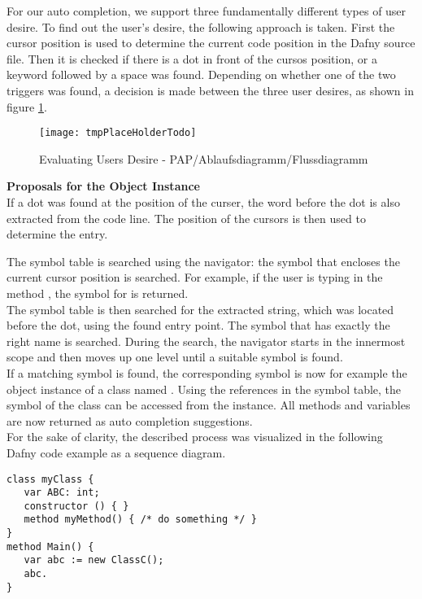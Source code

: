 For our auto completion, we support three fundamentally different types of user desire.
To find out the user's desire, the following approach is taken.
First the cursor position is used to determine the current code position in the Dafny source file.
Then it is checked if there is a dot in front of the cursos position,
or a  keyword followed by a space was found.
Depending on whether one of the two triggers was found,
a decision is made between the three user desires, as shown in figure \ref{fig:get_users_desire}.

\begin{figure}[H]
    \centering
    \texttt{[image: tmpPlaceHolderTodo]}
    \caption{Evaluating Users Desire - PAP/Ablaufsdiagramm/Flussdiagramm}
    \label{fig:get_users_desire}
\end{figure}

\textbf{Proposals for the Object Instance}\\
If a dot was found at the position of the curser, the word before the dot is also extracted from the code line.
The position of the cursors is then used to determine the entry.

The symbol table is searched using the navigator:
the symbol that encloses the current cursor position is searched.
For example, if the user is typing in the method , the symbol for  is returned. \\

The symbol table is then searched for the extracted string,
which was located before the dot, using the found entry point.
The symbol that has exactly the right name is searched.
During the search, the navigator starts in the innermost scope and then moves up one level until a suitable symbol is found. \\

If a matching symbol is found, the corresponding symbol is now
for example the object instance of a class named .
Using the references in the symbol table, the symbol of the class can be accessed from the instance.
All methods and variables are now returned as auto completion suggestions. \\

For the sake of clarity, the described process was visualized in the following
Dafny code example  as a sequence diagram.

\begin{lstlisting}[language=dafny, caption={tmptodo.dfy}, captionpos=b, label={lst:tmptodo}]
class myClass {
   var ABC: int;
   constructor () { }
   method myMethod() { /* do something */ }
}
method Main() {
   var abc := new ClassC();
   abc.
}
\end{lstlisting}

